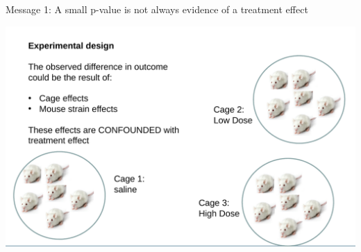 \documentclass{beamer}
\begin{document}
\begin{frame}{Message 1: A small p-value is not always evidence of a treatment effect}
\pause
 \vspace{-0.2cm}
 \begin{center}
  \includegraphics[width=\textwidth]{Figures/mice}
 \end{center}
 
\end{frame}
\end{document}
